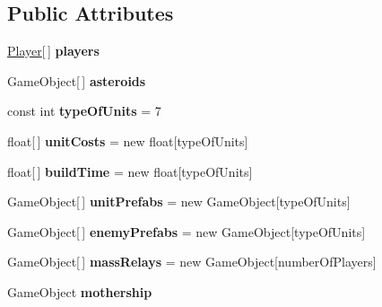 \subsection*{Public Attributes}
\begin{DoxyCompactItemize}
\item 
\hypertarget{class_game_controller_a674085d39c0f50688fe9af5f9596d806}{}\hyperlink{class_game_controller_1_1_player}{Player}\mbox{[}$\,$\mbox{]} {\bfseries players}\label{class_game_controller_a674085d39c0f50688fe9af5f9596d806}

\item 
\hypertarget{class_game_controller_aa81cbf39eea608ee93dc76c572b42195}{}Game\+Object\mbox{[}$\,$\mbox{]} {\bfseries asteroids}\label{class_game_controller_aa81cbf39eea608ee93dc76c572b42195}

\item 
\hypertarget{class_game_controller_a129b256ff0d239cac52dbc5882f147b1}{}const int {\bfseries type\+Of\+Units} = 7\label{class_game_controller_a129b256ff0d239cac52dbc5882f147b1}

\item 
\hypertarget{class_game_controller_a7d09c64261bcee941e31fe9b1db7272c}{}float\mbox{[}$\,$\mbox{]} {\bfseries unit\+Costs} = new float\mbox{[}type\+Of\+Units\mbox{]}\label{class_game_controller_a7d09c64261bcee941e31fe9b1db7272c}

\item 
\hypertarget{class_game_controller_a756f424fd8c407efecee7b7873a5f041}{}float\mbox{[}$\,$\mbox{]} {\bfseries build\+Time} = new float\mbox{[}type\+Of\+Units\mbox{]}\label{class_game_controller_a756f424fd8c407efecee7b7873a5f041}

\item 
\hypertarget{class_game_controller_aeb780e3e7da55b2127fee53ee5ee3d81}{}Game\+Object\mbox{[}$\,$\mbox{]} {\bfseries unit\+Prefabs} = new Game\+Object\mbox{[}type\+Of\+Units\mbox{]}\label{class_game_controller_aeb780e3e7da55b2127fee53ee5ee3d81}

\item 
\hypertarget{class_game_controller_a994169e702283f71d719b2e6889153f1}{}Game\+Object\mbox{[}$\,$\mbox{]} {\bfseries enemy\+Prefabs} = new Game\+Object\mbox{[}type\+Of\+Units\mbox{]}\label{class_game_controller_a994169e702283f71d719b2e6889153f1}

\item 
\hypertarget{class_game_controller_a5d6e972d3a815631c2e7c2d95df9b5e7}{}Game\+Object\mbox{[}$\,$\mbox{]} {\bfseries mass\+Relays} = new Game\+Object\mbox{[}number\+Of\+Players\mbox{]}\label{class_game_controller_a5d6e972d3a815631c2e7c2d95df9b5e7}

\item 
\hypertarget{class_game_controller_a862b42641a1c37db9ae6d99ddd3f33c2}{}Game\+Object {\bfseries mothership}\label{class_game_controller_a862b42641a1c37db9ae6d99ddd3f33c2}

\end{DoxyCompactItemize}
